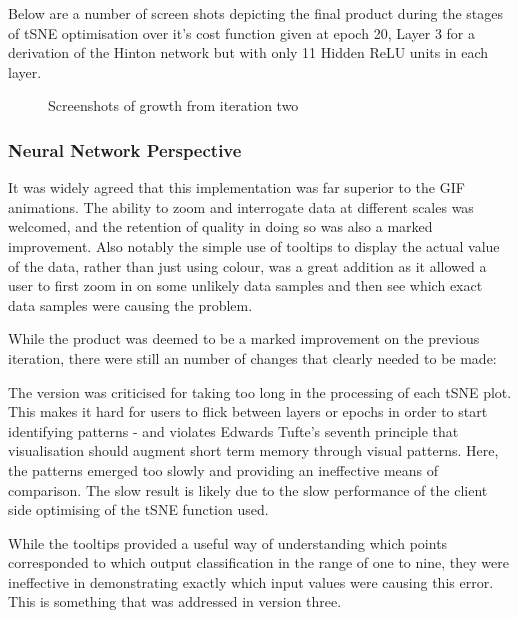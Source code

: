 \documentclass[a4paper,11pt,titlepage]{article}
\begin{document}
	Below are a number of screen shots depicting the final product during the stages of tSNE optimisation over it's cost function given at epoch 20,  Layer 3 for a derivation of the Hinton network but with only 11 Hidden ReLU units in each layer.
	
		\begin{figure}[H]
    			\centering	
    			\qquad
    			 \qquad
    			\caption{Screenshots of growth from iteration two}%
    			\label{fig:iter2}
	\end{figure}	
		
		\subsubsection{Neural Network Perspective}
		It was widely agreed that this implementation was far superior to the GIF animations. The ability to zoom and interrogate data at different scales was welcomed, and the retention of quality in doing so was also a marked improvement. Also notably the simple use of tooltips to display the actual value of the data, rather than just using colour, was a great addition as it allowed a user to first zoom in on some unlikely data samples and then see which exact data samples were causing the problem.
		\par 
		While the product was deemed to be a marked improvement on the previous iteration, there were still an number of changes that clearly needed to be made:
		\par 
		The version was criticised for taking too long in the processing of each tSNE plot. This makes it hard for users to flick between layers or epochs in order to start identifying patterns - and violates Edwards Tufte's seventh principle that visualisation should augment short term memory through visual patterns. Here, the patterns emerged too slowly and providing an ineffective means of comparison. The slow result is likely due to the slow performance of the client side optimising of the tSNE function used. 
		\par 
		While the tooltips provided a useful way of understanding which points corresponded to which output classification in the range of one to nine, they were ineffective in demonstrating exactly which input values were causing this error. This is something that was addressed in version three.
		
\end{document}

